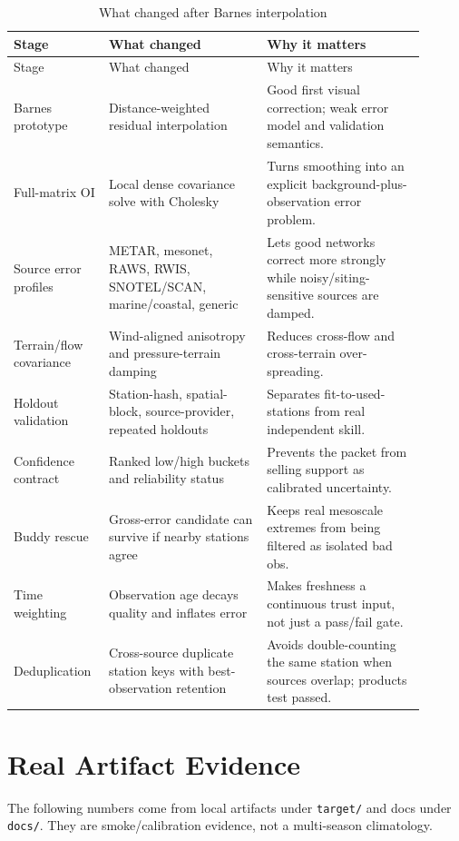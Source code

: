 \documentclass[11pt]{article}
\begin{document}
\begin{longtable}{p{0.18\linewidth} p{0.36\linewidth} p{0.36\linewidth}}
\caption{What changed after Barnes interpolation}\\
\toprule
Stage & What changed & Why it matters \\
\midrule
\endfirsthead
\toprule
Stage & What changed & Why it matters \\
\midrule
\endhead
Barnes prototype & Distance-weighted residual interpolation & Good first visual correction; weak error model and validation semantics. \\
Full-matrix OI & Local dense covariance solve with Cholesky & Turns smoothing into an explicit background-plus-observation error problem. \\
Source error profiles & METAR, mesonet, RAWS, RWIS, SNOTEL/SCAN, marine/coastal, generic & Lets good networks correct more strongly while noisy/siting-sensitive sources are damped. \\
Terrain/flow covariance & Wind-aligned anisotropy and pressure-terrain damping & Reduces cross-flow and cross-terrain over-spreading. \\
Holdout validation & Station-hash, spatial-block, source-provider, repeated holdouts & Separates fit-to-used-stations from real independent skill. \\
Confidence contract & Ranked low/high buckets and reliability status & Prevents the packet from selling support as calibrated uncertainty. \\
Buddy rescue & Gross-error candidate can survive if nearby stations agree & Keeps real mesoscale extremes from being filtered as isolated bad obs. \\
Time weighting & Observation age decays quality and inflates error & Makes freshness a continuous trust input, not just a pass/fail gate. \\
Deduplication & Cross-source duplicate station keys with best-observation retention & Avoids double-counting the same station when sources overlap; products test passed. \\
\bottomrule
\end{longtable}

\section{Real Artifact Evidence}

The following numbers come from local artifacts under \texttt{target/} and docs under
\texttt{docs/}. They are smoke/calibration evidence, not a multi-season climatology.
\end{document}
